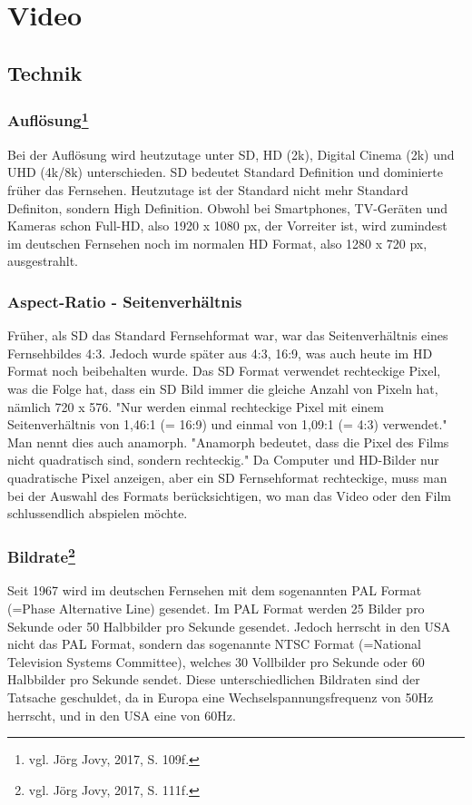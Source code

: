 \chapter{Video}
\renewcommand{\kapitelautor}{Autor: Kerstin Schön}
\section{Technik}
\subsection[Auflösung]{Auflösung\protect\footnote{\label{}vgl. Jörg Jovy, 2017, S. 109f.}}
Bei der Auflösung wird heutzutage unter SD, HD (2k), Digital Cinema (2k) und UHD (4k/8k) unterschieden. SD bedeutet Standard Definition und dominierte früher das Fernsehen. Heutzutage ist der Standard nicht mehr Standard Definiton, sondern High Definition. Obwohl bei Smartphones, TV-Geräten und Kameras schon Full-HD, also 1920 x 1080 px, der Vorreiter ist, wird zumindest im deutschen Fernsehen noch im normalen HD Format, also 1280 x 720 px, ausgestrahlt. 
\subsection{Aspect-Ratio - Seitenverhältnis}
Früher, als SD das Standard Fernsehformat war, war das Seitenverhältnis eines Fernsehbildes 4:3. Jedoch wurde später aus 4:3, 16:9, was auch heute im HD Format noch beibehalten wurde. Das SD Format verwendet rechteckige Pixel, was die Folge hat, dass ein SD Bild immer die gleiche Anzahl von Pixeln hat, nämlich 720 x 576. "Nur werden einmal rechteckige Pixel mit einem Seitenverhältnis von 1,46:1 (= 16:9) und einmal von 1,09:1 (= 4:3) verwendet." Man nennt dies auch anamorph. "Anamorph bedeutet, dass die Pixel des Films nicht quadratisch sind, sondern rechteckig." Da Computer und HD-Bilder nur quadratische Pixel anzeigen, aber ein SD Fernsehformat rechteckige, muss man bei der Auswahl des Formats berücksichtigen, wo man das Video oder den Film schlussendlich abspielen möchte.
\subsection[Bildrate]{Bildrate\protect\footnote{\label{}vgl. Jörg Jovy, 2017, S. 111f.}}
Seit 1967 wird im deutschen Fernsehen mit dem sogenannten PAL Format (=Phase Alternative Line) gesendet. Im PAL Format werden 25 Bilder pro Sekunde oder 50 Halbbilder pro Sekunde gesendet. Jedoch herrscht in den USA nicht das PAL Format, sondern das sogenannte NTSC Format (=National Television Systems Committee), welches 30 Vollbilder pro Sekunde oder 60 Halbbilder pro Sekunde sendet. Diese unterschiedlichen Bildraten sind der Tatsache geschuldet, da in Europa eine Wechselspannungsfrequenz von 50Hz herrscht, und in den USA eine von 60Hz.
